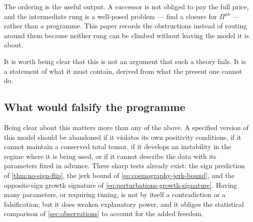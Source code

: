 The ordering is the useful output. A successor is not obliged to pay the full
price, and the intermediate rung is a well-posed problem --- find a closure for
$\Pi^{\mu\nu}$ --- rather than a programme. This paper records the
obstructions instead of routing around them because neither rung can be
climbed without leaving the model it is about.

It is worth being clear that this is not an argument that such a theory fails.
It is a statement of what it must contain, derived from what the present one
cannot do.

\subsection{What would falsify the programme}\label{sec:outlook-falsify}

Being clear about this matters more than any of the above. A specified version
of this model should be abandoned if it violates its own positivity conditions,
if it cannot maintain a conserved total tensor, if it develops an instability
in the regime where it is being used, or if it cannot describe the data with
its parameters fixed in advance. Three sharp tests already exist: the sign
prediction of \cref{thm:no-sign-flip}, the jerk bound of
\cref{eq:cosmography-jerk-bound}, and the opposite-sign growth signature of
\cref{eq:perturbations-growth-signature}. Having many parameters, or requiring
tuning, is not by itself a contradiction or a falsification; but it does weaken
explanatory power, and it obliges the statistical comparison of
\cref{sec:observations} to account for the added freedom.
